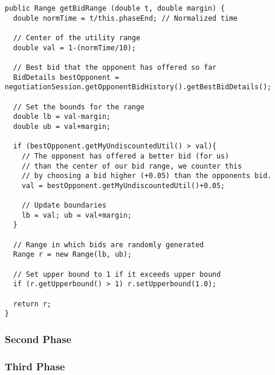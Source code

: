 \begin{lstlisting}[caption=Code for calculating bid range as function of normalized time, label=code:getrangefunctionfirstphase]
public Range getBidRange (double t, double margin) {
  double normTime = t/this.phaseEnd; // Normalized time
  
  // Center of the utility range
  double val = 1-(normTime/10);
  
  // Best bid that the opponent has offered so far
  BidDetails bestOpponent = negotiationSession.getOpponentBidHistory().getBestBidDetails();
  
  // Set the bounds for the range
  double lb = val-margin;
  double ub = val+margin;
  
  if (bestOpponent.getMyUndiscountedUtil() > val){
    // The opponent has offered a better bid (for us)
    // than the center of our bid range, we counter this
    // by choosing a bid higher (+0.05) than the opponents bid.
    val = bestOpponent.getMyUndiscountedUtil()+0.05;
    
    // Update boundaries
    lb = val; ub = val+margin;
  }
  
  // Range in which bids are randomly generated
  Range r = new Range(lb, ub); 
  
  // Set upper bound to 1 if it exceeds upper bound
  if (r.getUpperbound() > 1) r.setUpperbound(1.0);
  
  return r;
}
\end{lstlisting}

\subsubsection{Second Phase}

\subsubsection{Third Phase}